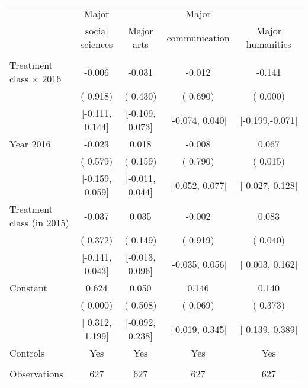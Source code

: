 \begin{tabular}{lcccc} \toprule
& Major &  & Major & \tabularnewline
& social sciences & Major arts & communication & Major humanities \tabularnewline \midrule
&  &  &  & \tabularnewline
Treatment class $\times$ 2016 & -0.006 & -0.031 & -0.012 & -0.141\tabularnewline
& ( 0.918) & ( 0.430) & ( 0.690) & ( 0.000)\tabularnewline
& {[}-0.111, 0.144{]} & {[}-0.109, 0.073{]} & {[}-0.074, 0.040{]} & {[}-0.199,-0.071{]}\tabularnewline
Year 2016  & -0.023 &  0.018 & -0.008 &  0.067\tabularnewline
& ( 0.579) & ( 0.159) & ( 0.790) & ( 0.015)\tabularnewline
& {[}-0.159, 0.059{]} & {[}-0.011, 0.044{]} & {[}-0.052, 0.077{]} & {[} 0.027, 0.128{]}\tabularnewline
Treatment class (in 2015) & -0.037 &  0.035 & -0.002 &  0.083\tabularnewline
& ( 0.372) & ( 0.149) & ( 0.919) & ( 0.040)\tabularnewline
& {[}-0.141, 0.043{]} & {[}-0.013, 0.096{]} & {[}-0.035, 0.056{]} & {[} 0.003, 0.162{]}\tabularnewline
Constant  &  0.624 &  0.050 &  0.146 &  0.140\tabularnewline
& ( 0.000) & ( 0.508) & ( 0.069) & ( 0.373)\tabularnewline
& {[} 0.312, 1.199{]} & {[}-0.092, 0.238{]} & {[}-0.019, 0.345{]} & {[}-0.139, 0.389{]}\tabularnewline
Controls & Yes & Yes & Yes & Yes\tabularnewline
&  &  &  & \tabularnewline
Observations & 627 & 627 & 627 & 627\tabularnewline
\bottomrule \bottomrule
\end{tabular}
